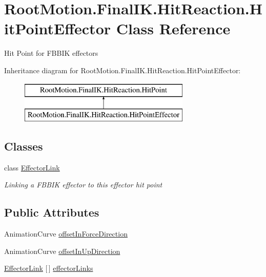 \hypertarget{class_root_motion_1_1_final_i_k_1_1_hit_reaction_1_1_hit_point_effector}{}\section{Root\+Motion.\+Final\+I\+K.\+Hit\+Reaction.\+Hit\+Point\+Effector Class Reference}
\label{class_root_motion_1_1_final_i_k_1_1_hit_reaction_1_1_hit_point_effector}


Hit Point for F\+B\+B\+IK effectors  


Inheritance diagram for Root\+Motion.\+Final\+I\+K.\+Hit\+Reaction.\+Hit\+Point\+Effector\+:\begin{figure}[H]
\begin{center}
\leavevmode
\includegraphics[height=2.000000cm]{class_root_motion_1_1_final_i_k_1_1_hit_reaction_1_1_hit_point_effector}
\end{center}
\end{figure}
\subsection*{Classes}
\begin{DoxyCompactItemize}
\item 
class \mbox{\hyperlink{class_root_motion_1_1_final_i_k_1_1_hit_reaction_1_1_hit_point_effector_1_1_effector_link}{Effector\+Link}}
\begin{DoxyCompactList}\small\item\em Linking a F\+B\+B\+IK effector to this effector hit point \end{DoxyCompactList}\end{DoxyCompactItemize}
\subsection*{Public Attributes}
\begin{DoxyCompactItemize}
\item 
Animation\+Curve \mbox{\hyperlink{class_root_motion_1_1_final_i_k_1_1_hit_reaction_1_1_hit_point_effector_a383cbe7409bf17abea65376415c29ab3}{offset\+In\+Force\+Direction}}
\item 
Animation\+Curve \mbox{\hyperlink{class_root_motion_1_1_final_i_k_1_1_hit_reaction_1_1_hit_point_effector_afc26f8c8236d4c4ed061933eb5b3989d}{offset\+In\+Up\+Direction}}
\item 
\mbox{\hyperlink{class_root_motion_1_1_final_i_k_1_1_hit_reaction_1_1_hit_point_effector_1_1_effector_link}{Effector\+Link}} \mbox{[}$\,$\mbox{]} \mbox{\hyperlink{class_root_motion_1_1_final_i_k_1_1_hit_reaction_1_1_hit_point_effector_ac4c4da98427d29a42ce06b0f1bb8938e}{effector\+Links}}
\end{DoxyCompactItemize}
